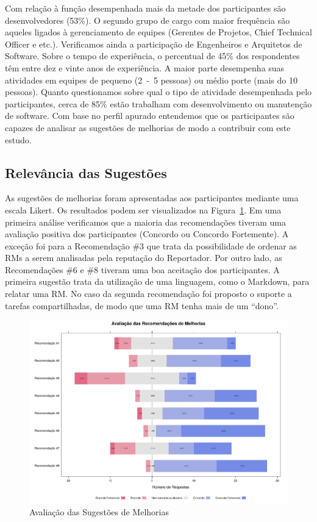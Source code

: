 Com relação à função desempenhada mais da metade dos participantes são
desenvolvedores (53\%). O segundo grupo de cargo com maior frequência são
aqueles ligados à gerenciamento de equipes (Gerentes de Projetos, Chief
Technical Officer e etc.). Verificamos ainda a participação de Engenheiros e
Arquitetos de Software. Sobre o tempo de experiência, o percentual de 45\% dos
respondentes têm entre dez e vinte anos de experiência. A maior parte desempenha
suas atividades em equipes de pequeno (2~-~5 pessoas) ou médio porte (mais do 10
pessoas). Quanto questionamos sobre qual o tipo de atividade desempenhada pelo
participantes, cerca de 85\% estão trabalham com desenvolvimento ou manutenção
de software. Com base no perfil apurado entendemos que os participantes são
capazes de analisar as sugestões de melhorias de modo a contribuir com este
estudo.

\subsection{Relevância das Sugestões}
\label{sub:sug_melhorias_resultados_relevancia}

As sugestões de melhorias foram apresentadas aos participantes mediante uma
escala Likert. Os resultados podem ser visualizados na
Figura~\ref{fig:plot_likert_avaliacao_sug_melhorias}. Em uma primeira análise
verificamos que a maioria das recomendações tiveram uma avaliação positiva dos
participantes (Concordo ou Concordo Fortemente). A exceção foi para a
Recomendação \#3 que trata da possibilidade de ordenar as RMs a serem analisadas
pela reputação do Reportador. Por outro lado, as Recomendações \#6 e \#8 tiveram
uma boa aceitação dos participantes. A primeira sugestão trata da utilização de
uma linguagem, como o Markdown, para relatar uma RM\@. No caso da segunda
recomendação foi proposto o suporte a tarefas compartilhadas, de modo que uma RM
tenha mais de um ``dono''.

\begin{figure}[htpb]
    \centering
    \includegraphics[width=1.1\linewidth]{chapter-sugestoes-melhorias-fgrm/img/plot_likert_avaliacao_sug_melhorias.pdf}
    \caption{Avaliação das Sugestões de Melhorias}
\label{fig:plot_likert_avaliacao_sug_melhorias}
\end{figure}

